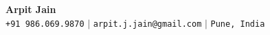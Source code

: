 \begin{center}
    \textbf{\Huge Arpit Jain} \\ \vspace{5pt}
    \small \faPhone* \texttt{+91 986.069.9870} \hspace{1pt} $|$
    \hspace{1pt} \faEnvelope \hspace{2pt} \texttt{arpit.j.jain@gmail.com} \hspace{1pt} $|$ 
    \hspace{1pt} \faMapMarker* \hspace{2pt}\texttt{Pune, India}
    \\ \vspace{-3pt}
\end{center}
